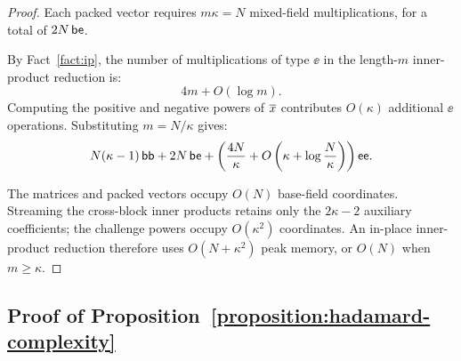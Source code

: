 \begin{proof}
Each packed vector requires \(m\kappa=N\) mixed-field
multiplications, for a total of \(2N\,\mathsf{be}\).

By Fact~\ref{fact:ip}, the number of multiplications of type
\(\ee\) in the length-\(m\) inner-product reduction is:
\[
    4m+O(\log m).
\]
Computing the positive and negative powers of \(\overline{x}\)
contributes \(O(\kappa)\)
additional \(\ee\) operations. Substituting \(m=N/\kappa\) gives:
\[
    N(\kappa-1)\,\mathsf{bb}
    +
    2N\,\mathsf{be}
    +
    \left(
        \frac{4N}{\kappa}
        +
        O\left(
            \kappa+\log\frac{N}{\kappa}
        \right)
    \right)\mathsf{ee}.
\]

The matrices and packed vectors occupy \(O(N)\) base-field
coordinates. Streaming the cross-block inner products retains
only the \(2\kappa-2\) auxiliary coefficients; the challenge
powers occupy \(O(\kappa^2)\) coordinates. An in-place
inner-product reduction therefore uses \(O(N+\kappa^2)\) peak
memory, or \(O(N)\) when \(m\geq\kappa\).
\end{proof}

\subsection{Proof of Proposition~\ref{proposition:hadamard-complexity}}
\label{appx:proof-hadamard}

